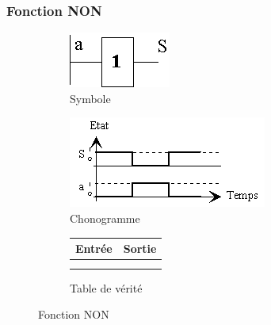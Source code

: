 \documentclass[10pt,fleqn]{article} %
\begin{document}
\subsubsection{Fonction NON}
\begin{figure}[ht]
  \begin{subfigure}{.2\textwidth}
    \includegraphics[width=\textwidth]{images/oui_symb}
    \caption{Symbole}
    \centering
  \end{subfigure}
  \begin{subfigure}{.4\textwidth}
    \centering
    \includegraphics[width=\textwidth]{images/non_chrono}
    \caption{Chonogramme}
  \end{subfigure}
  \begin{subfigure}{.33\textwidth}
    \centering
    \begin{tabular}{|c|c|}
      \hline
      \textbf{Entrée}& \textbf{Sortie} \\
      \hline
       & \\ \hline
       & \\ \hline
    \end{tabular}
    \caption{Table de vérité}
  \end{subfigure}
  \caption{Fonction NON}
\end{figure}
\end{document}
